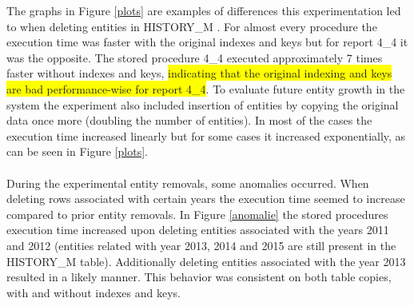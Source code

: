 \documentclass{cslthse-msc}
\newcommand{\hilight}[1]{\colorbox{yellow}{#1}}
\begin{document}
The graphs in Figure \ref{plots} are examples of differences this experimentation led to when deleting entities in HISTORY\_M . For almost every procedure the execution time was faster with the original indexes and keys but for report 4\_4 it was the opposite. The stored procedure 4\_4 executed approximately 7 times faster without indexes and keys, \hilight{indicating that the original indexing and keys are bad performance-wise for report 4\_4}. To evaluate future entity growth in the system the experiment also included insertion of entities by copying the original data once more (doubling the number of entities). In most of the cases the execution time increased linearly but for some cases it increased exponentially, as can be seen in Figure \ref{plots}.\\\\
During the experimental entity removals, some anomalies occurred. When deleting rows associated with certain years the execution time seemed to increase compared to prior entity removals. In Figure \ref{anomalie} the stored procedures execution time increased upon deleting entities associated with the years 2011 and 2012 (entities related with year 2013, 2014 and 2015 are still present in the HISTORY\_M table). Additionally deleting entities associated with the year 2013 resulted in a likely manner. This behavior was consistent on both table copies, with and without indexes and keys. 
\end{document}
